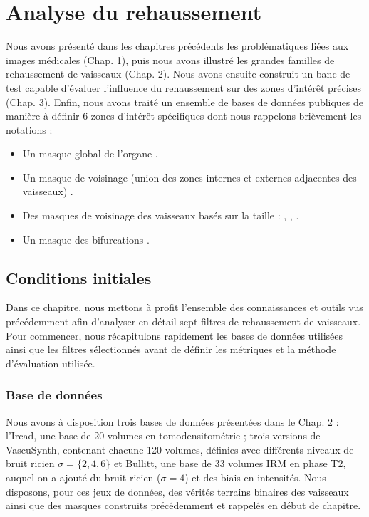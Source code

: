 \chapter{Analyse du rehaussement}
\label{sec:Analysis}
Nous avons présenté dans les chapitres précédents les problématiques liées aux images médicales (Chap. 1), puis nous avons illustré les grandes familles de rehaussement de vaisseaux (Chap. 2). Nous avons ensuite construit un banc de test capable d'évaluer l'influence du rehaussement sur des zones d'intérêt précises (Chap. 3). Enfin, nous avons traité un ensemble de bases de données publiques de manière à définir 6 zones d'intérêt spécifiques dont nous rappelons brièvement les notations :

\begin{itemize}
\item Un masque global de l'organe \maskglobal.
\item Un masque de voisinage (union des zones internes et externes adjacentes des vaisseaux)  \maskvascular.
\item Des masques de voisinage des vaisseaux basés sur la taille : \maskvesselLarge, \maskvesselMedium, \maskvesselSmall.
\item Un masque des bifurcations \maskbif.
\end{itemize}

\section{Conditions initiales}

Dans ce chapitre, nous mettons à profit l'ensemble des connaissances et outils vus précédemment afin d'analyser en détail sept filtres de rehaussement de vaisseaux. Pour commencer, nous récapitulons rapidement les bases de données utilisées ainsi que les filtres sélectionnés avant de définir les métriques et la méthode d'évaluation utilisée.

\subsection{Base de données}
Nous avons à disposition trois bases de données présentées dans le Chap. 2 : l'Ircad, une base de 20 volumes en tomodensitométrie ; trois versions de VascuSynth, contenant chacune 120 volumes, définies avec différents niveaux de bruit ricien $\sigma=\{2,4,6\}$ et Bullitt, une base de 33 volumes IRM en phase T2, auquel on a ajouté du bruit ricien ($\sigma=4$) et des biais en intensités. Nous disposons, pour ces jeux de données, des vérités terrains binaires des vaisseaux ainsi que des masques construits précédemment et rappelés en début de chapitre.

